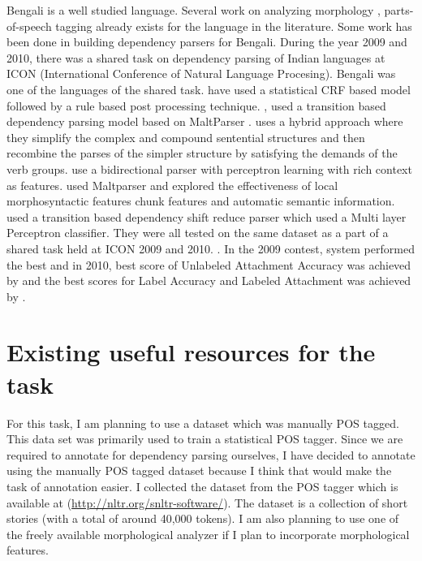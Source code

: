 \documentclass[11pt,letterpaper]{article}
\begin{document}
Bengali is a well studied language. Several work on analyzing morphology \citep{Dasgupta_morphologicalanalysis}, parts-of-speech tagging \citep{Dandapat:2007} already exists for the language in the literature. Some work has been done in building dependency parsers for Bengali. During the year 2009 and 2010, there was a shared task on dependency parsing of Indian languages  at ICON (International Conference of Natural Language Procesing). Bengali was one of the languages of the shared task.  \citep{ghosh2009dependency} have used a statistical CRF based model followed by a rule based post processing technique. \citep{Nivre_parsingindian}, \citep{ambati_09} used a transition based dependency parsing model based on MaltParser \citep{Nivre05maltparser:a}. \citep{De_Dep_ben} uses a hybrid approach where they simplify the complex and compound sentential structures and then recombine the parses of the simpler structure by satisfying the demands of the verb groups. \citep{bidir_parser} use a bidirectional parser with perceptron learning with rich context as features. \citep{kosaraju_10} used Maltparser and explored the effectiveness of local morphosyntactic features chunk features and automatic semantic information. \citep{attardi_10} used a transition based dependency shift reduce parser which used a Multi layer Perceptron classifier. They were all tested on the same dataset as a part of a shared task held at ICON 2009 and 2010. \citep{husain_09, husain_10}. In the 2009 contest, \citep{ambati_09} system performed the best and in 2010, best score of Unlabeled Attachment Accuracy was achieved by \citep{attardi_10} and the best scores for Label Accuracy and Labeled Attachment was achieved by  \citep{kosaraju_10}.

\section{Existing useful resources for the task}
 For this task, I am planning to use a dataset which was manually POS tagged. This data set was primarily used to train a statistical POS tagger. Since we are required to annotate for dependency parsing ourselves, I have decided to annotate using the manually POS tagged dataset because I think that would make the task of annotation easier. I collected the dataset from the POS tagger which is available at (\url{http://nltr.org/snltr-software/}). The dataset is a collection of short stories (with a total of around 40,000 tokens). I am also planning to use one of the freely available morphological analyzer if I plan to incorporate morphological features. 
\end{document}
